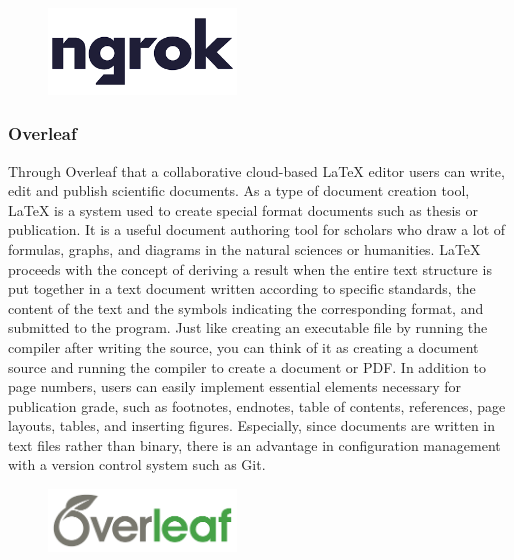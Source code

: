 \documentclass[conference]{IEEEtran}
\begin{document}
\begin{figure}[h!]
\includegraphics[width=5cm]{imagefolder/ngrok.png}
\caption{}
\label{fig:map}
\end{figure}

\subsubsection{Overleaf}
Through Overleaf that a collaborative cloud-based LaTeX editor users can write, edit and publish scientific documents. As a type of document creation tool, LaTeX is a system used to create special format documents such as thesis or publication. It is a useful document authoring tool for scholars who draw a lot of formulas, graphs, and diagrams in the natural sciences or humanities. LaTeX proceeds with the concept of deriving a result when the entire text structure is put together in a text document written according to specific standards, the content of the text and the symbols indicating the corresponding format, and submitted to the program. Just like creating an executable file by running the compiler after writing the source, you can think of it as creating a document source and running the compiler to create a document or PDF. In addition to page numbers, users can easily implement essential elements necessary for publication grade, such as footnotes, endnotes, table of contents, references, page layouts, tables, and inserting figures. Especially, since documents are written in text files rather than binary, there is an advantage in configuration management with a version control system such as Git.\\
\begin{figure}[h!]
\centering
\includegraphics[width=5cm]{imagefolder/overleaf.png}
\caption{}
\label{fig:map}
\end{figure}
\end{document}
